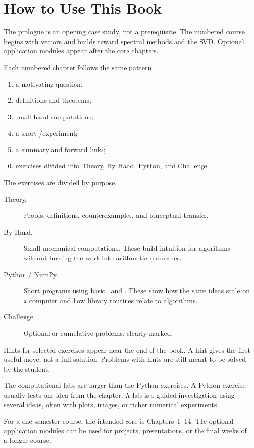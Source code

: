 \chapter*{How to Use This Book}

The prologue is an opening case study, not a prerequisite. The numbered course
begins with vectors and builds toward spectral methods and the SVD. Optional
application modules appear after the core chapters.

Each numbered chapter follows the same pattern:

\begin{enumerate}
  \item a motivating question;
  \item definitions and theorems;
  \item small hand computations;
  \item a short \Python/\NumPy experiment;
  \item a summary and forward links;
  \item exercises divided into Theory, By Hand, Python, and Challenge.
\end{enumerate}

The exercises are divided by purpose.

\begin{description}
  \item[Theory.] Proofs, definitions, counterexamples, and conceptual transfer.
  \item[By Hand.] Small mechanical computations. These build intuition for
    algorithms without turning the work into arithmetic endurance.
  \item[Python / NumPy.] Short programs using basic \Python\ and \NumPy. These
    show how the same ideas scale on a computer and how library routines relate
    to algorithms.
  \item[Challenge.] Optional or cumulative problems, clearly marked.
\end{description}

Hints for selected exercises appear near the end of the book. A hint gives the
first useful move, not a full solution. Problems with hints are still meant to
be solved by the student.

The computational labs are larger than the Python exercises. A Python exercise
usually tests one idea from the chapter. A lab is a guided investigation using
several ideas, often with plots, images, or richer numerical experiments.

For a one-semester course, the intended core is Chapters~1--14. The optional
application modules can be used for projects, presentations, or the final weeks
of a longer course.
